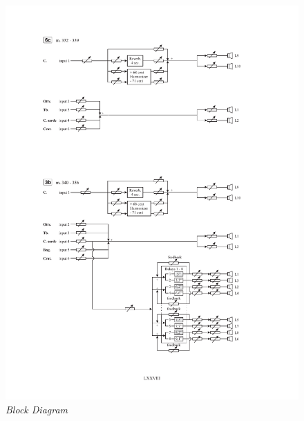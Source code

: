 \documentclass[twoside,a4paper]{article}
\begin{document}
\begin{figure}[ht]
\centerline{\includegraphics[scale=0.5]{img/re-diagramma6c}}
\caption{\label{re-dia-6c}{\it Block Diagram}}
\end{figure}
\end{document}
